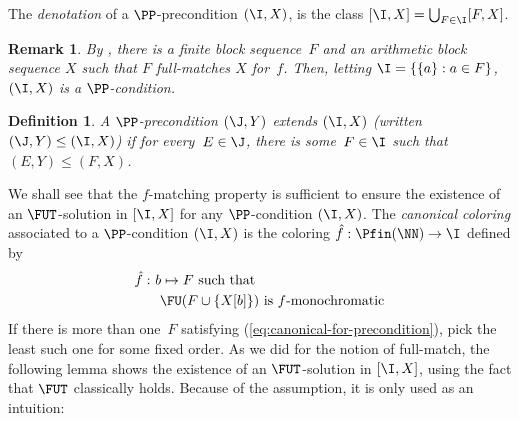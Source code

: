 \documentclass{article}
\numberwithin{theorem}{section}
\newtheorem{remark}[theorem]{Remark}
\newtheorem{definition}[theorem]{Definition}
\begin{document}
The \emph{denotation} of a $\PP$-precondition $(\I, X)$, is the class $[\I, X] = \bigcup_{F \in \I} [F, X]$.


\begin{remark}
By , there is a finite block sequence~$F$ and an arithmetic block sequence $X$
such that $F$ full-matches $X$ for~$f$.
Then, letting $\I = \{ \{a\} : a \in F \}$, $(\I, X)$ is a $\PP$-condition.
\end{remark}

\begin{definition}
A $\PP$-precondition $(\J, Y)$ \emph{extends} $(\I, X)$ (written $(\J, Y) \leq (\I, X)$) if for every~$E \in \J$, there is some~$F \in \I$ such that $(E, Y) \leq (F, X)$. 
\end{definition}

We shall see that the $f$-matching property is sufficient to ensure the existence of an $\FUT$-solution in $[\I, X]$ for any $\PP$-condition $(\I, X)$.
The \emph{canonical coloring} associated to a $\PP$-condition $(\I, X)$ is the coloring $\hat f : \Pfin(\NN) \to \I$ defined by
\begin{align}\label{eq:canonical-for-precondition}
\hat f :\ & b \mapsto F \text{ such that } \notag \\
 & \text{ $\FU(F \cup \{X[b]\})$ is $f$-monochromatic}
\end{align}
If there is more than one~$F$ satisfying (\ref{eq:canonical-for-precondition}), pick the least such one for some fixed order.
As we did for the notion of full-match, the following lemma shows the existence of an $\FUT$-solution in $[\I, X]$, using the fact that $\FUT$ classically holds. Because of the assumption, it is only used as an intuition:
\end{document}

